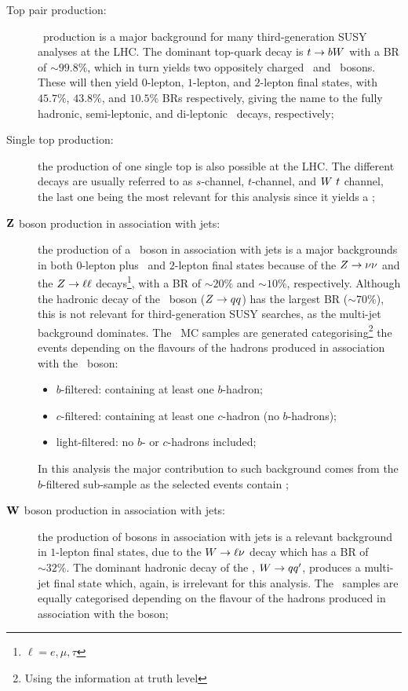 		\begin{description}

			\item [Top pair production:] \ttbar\ production is a major background for many third-generation \ac{SUSY} analyses at the LHC. The dominant top-quark decay is $t \rightarrow b W$ with a \ac{BR} of $\sim 99.8\%$, which in turn yields two oppositely charged \bjs\ and \Wboson\ bosons. These will then yield $0$-lepton, $1$-lepton, and $2$-lepton final states, with $45.7\%$, $43.8\%$, and $10.5\%$ \acp{BR} respectively, giving the name to the fully hadronic, semi-leptonic, and di-leptonic \ttbar\ decays, respectively; 
			
			\item [Single top production:] the production of one single top is also possible at the LHC. The different decays are usually referred to as $s$-channel, $t$-channel, and $W\ t$ channel, the last one being the most relevant for this analysis since it yields a \Wboson; 

			\item [$\mathbf{Z}$ boson production in association with jets:] the production of a \Zboson\ boson in association with jets is a major backgrounds in both $0$-lepton plus \met\ and $2$-lepton final states because of the $Z \rightarrow \nu \nu$ and the $Z \rightarrow \ell \ell$ decays\footnote{$\ell = e,\mu,\tau$}, with a \ac{BR} of $\sim 20\%$ and $\sim 10\%$, respectively. Although the hadronic decay of the \Zboson\ boson ($Z \rightarrow qq$) has the largest \ac{BR} ($\sim 70\%$), this is not relevant for third-generation \ac{SUSY} searches, as the multi-jet background dominates. The \Zjets\ \ac{MC} samples are generated categorising\footnote{Using the information at truth level} the events depending on the flavours of the hadrons produced in association with the \Zboson\ boson:
			\begin{itemize}
				\item $b$-filtered: containing at least one $b$-hadron;
				\item $c$-filtered: containing at least one $c$-hadron (no $b$-hadrons);
				\item light-filtered: no $b$- or $c$-hadrons included;
			\end{itemize} 
			In this analysis the major contribution to such background comes from the $b$-filtered sub-sample as the selected events contain \bjs;

			\item [$\mathbf{W}$ boson production in association with jets:] the production of \Wboson bosons in association with jets is a relevant background in $1$-lepton final states, due to the $W \rightarrow \ell\nu$ decay which has a \ac{BR} of $\sim 32\%.$ The dominant hadronic decay of the \Wboson, $W \rightarrow qq'$, produces a multi-jet final state which, again, is irrelevant for this analysis. The \Wjets\ samples are equally categorised depending on the flavour of the hadrons produced in association with the \Wboson boson;


\end{description}

